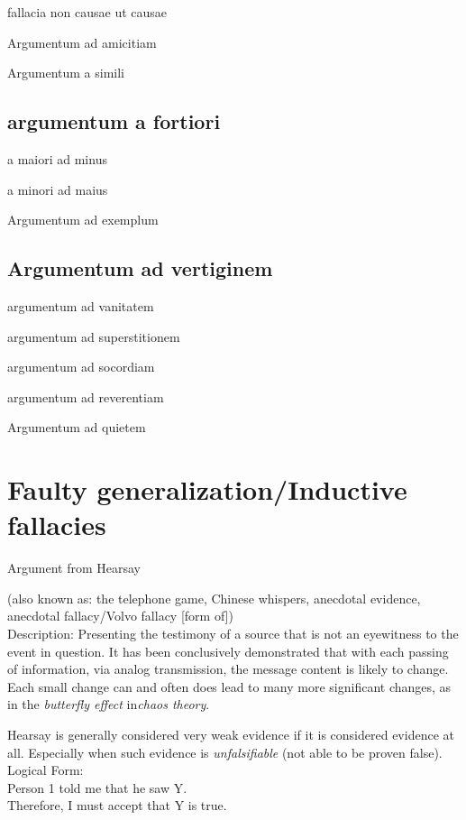 \documentclass[a4paper,12pt,single,pdftex]{scrartcl}
\begin{document}
fallacia non causae ut causae

Argumentum ad amicitiam

Argumentum a simili\subsection{argumentum a fortiori}


a maiori ad minus

a minori ad maius

Argumentum ad exemplum\subsection{Argumentum ad vertiginem}


argumentum ad vanitatem

argumentum ad superstitionem

argumentum ad socordiam

argumentum ad reverentiam

Argumentum ad quietem\section{Faulty generalization/Inductive fallacies}


Argument from Hearsay
    
      (also known as: the telephone game, Chinese whispers, anecdotal evidence, anecdotal fallacy/Volvo fallacy [form of])
    \\

  
    Description: Presenting the testimony of a source that is not an eyewitness to the event in question.  It has been conclusively demonstrated that with each passing of information, via analog transmission, the message content is likely to change.  Each small change can and often does lead to many more significant changes, as in the {\it butterfly effect} in{\it  chaos theory}.

    
      Hearsay is generally considered very weak evidence if it is considered evidence at all.  Especially when such evidence is {\it unfalsifiable}  (not able to be proven false).
    \\

    
      Logical Form:
    \\

    
      Person 1 told me that he saw Y.
    \\

    
      Therefore, I must accept that Y is true.
    \\
\end{document}
